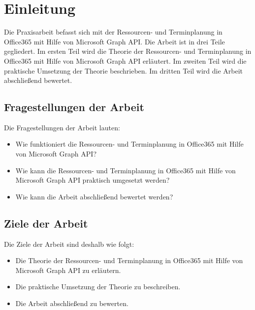 


\section{Einleitung}
Die Praxisarbeit befasst sich mit der Ressourcen- und Terminplanung in Office365 mit Hilfe von Microsoft Graph API. Die Arbeit ist in drei Teile gegliedert. Im ersten Teil wird die Theorie der Ressourcen- und Terminplanung in Office365 mit Hilfe von Microsoft Graph API erläutert. Im zweiten Teil wird die praktische Umsetzung der Theorie beschrieben. Im dritten Teil wird die Arbeit abschließend bewertet.
    \newline
    \subsection{Fragestellungen der Arbeit}
    Die Fragestellungen der Arbeit lauten:
    \begin{itemize}
        \item Wie funktioniert die Ressourcen- und Terminplanung in Office365 mit Hilfe von Microsoft Graph API?
        \item Wie kann die Ressourcen- und Terminplanung in Office365 mit Hilfe von Microsoft Graph API praktisch umgesetzt werden?
        \item Wie kann die Arbeit abschließend bewertet werden?
    \end{itemize}
    \subsection{Ziele der Arbeit}
    Die Ziele der Arbeit sind deshalb wie folgt:
    \begin{itemize}
        \item Die Theorie der Ressourcen- und Terminplanung in Office365 mit Hilfe von Microsoft Graph API zu erläutern.
        \item Die praktische Umsetzung der Theorie zu beschreiben.
        \item Die Arbeit abschließend zu bewerten.
    \end{itemize}

\newpage

